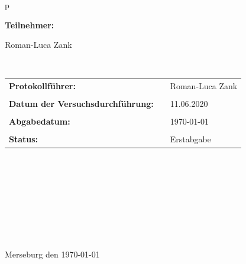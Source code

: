 \begin{center}
\begin{tabular}{p{\textwidth}}
		
		
		\begin{center}
			\Large{\textbf{Teilnehmer:}} \\ 
		\end{center}
		\begin{center}
			\large{Roman-Luca Zank}
		\end{center}
		
		
		\\
		
		\begin{center}
			\begin{tabular}{lll}
				\large{\textbf{Protokollführer:}} & &  \large{Roman-Luca Zank}\\
				&&\\
				\large{\textbf{Datum der Versuchsdurchführung:}}&& \large{11.06.2020}\\
				&&\\
				\large{\textbf{Abgabedatum:}}&& \large{\today}\\
				&&\\
				\large{\textbf{Status:}}&& \large{Erstabgabe}\\
			\end{tabular}
		\end{center}
		
		\\ \\ \\ \\ \\ \\ \\ \\
		\large{Merseburg den \today}
		
	\end{tabular}
\end{center}
